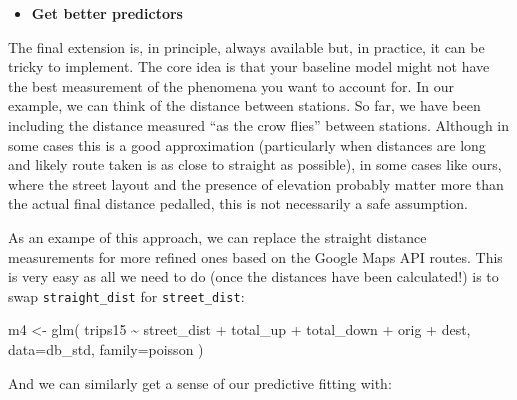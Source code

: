 \documentclass[
  letterpaper,
  krantz2]{style/krantz}
\newenvironment{Shaded}{\begin{snugshade}}{\end{snugshade}}
\newcommand{\AttributeTok}[1]{\textcolor[rgb]{0.40,0.45,0.13}{#1}}
\newcommand{\FunctionTok}[1]{\textcolor[rgb]{0.28,0.35,0.67}{#1}}
\newcommand{\NormalTok}[1]{\textcolor[rgb]{0.00,0.23,0.31}{#1}}
\newcommand{\OtherTok}[1]{\textcolor[rgb]{0.00,0.23,0.31}{#1}}
\newcommand{\StringTok}[1]{\textcolor[rgb]{0.13,0.47,0.30}{#1}}
\providecommand{\tightlist}{%
  \setlength{\itemsep}{0pt}\setlength{\parskip}{0pt}}\usepackage{longtable,booktabs,array}
\begin{document}
\begin{itemize}
\tightlist
\item
  \textbf{Get better predictors}
\end{itemize}

The final extension is, in principle, always available but, in practice,
it can be tricky to implement. The core idea is that your baseline model
might not have the best measurement of the phenomena you want to account
for. In our example, we can think of the distance between stations. So
far, we have been including the distance measured ``as the crow flies''
between stations. Although in some cases this is a good approximation
(particularly when distances are long and likely route taken is as close
to straight as possible), in some cases like ours, where the street
layout and the presence of elevation probably matter more than the
actual final distance pedalled, this is not necessarily a safe
assumption.

As an exampe of this approach, we can replace the straight distance
measurements for more refined ones based on the Google Maps API routes.
This is very easy as all we need to do (once the distances have been
calculated!) is to swap \texttt{straight\_dist} for
\texttt{street\_dist}:

\begin{Shaded}
\begin{Highlighting}[]
\NormalTok{m4 }\OtherTok{\textless{}{-}} \FunctionTok{glm}\NormalTok{(}
  \StringTok{\textquotesingle{}trips15 \textasciitilde{} street\_dist + total\_up + total\_down + orig + dest\textquotesingle{}}\NormalTok{, }
  \AttributeTok{data=}\NormalTok{db\_std,}
  \AttributeTok{family=}\NormalTok{poisson}
\NormalTok{)}
\end{Highlighting}
\end{Shaded}

And we can similarly get a sense of our predictive fitting with:
\end{document}

